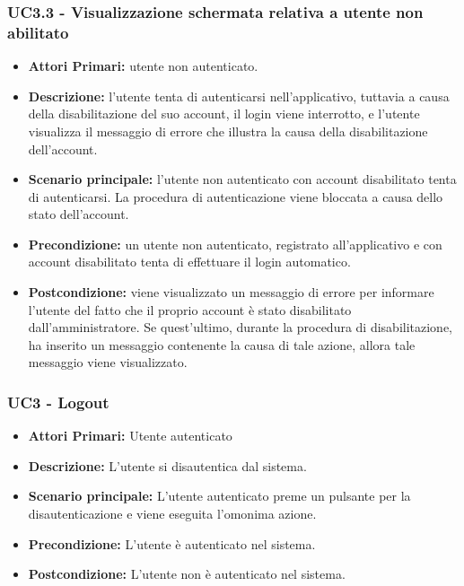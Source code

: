 \subsubsection{ UC3.3 - Visualizzazione schermata relativa a utente non abilitato}
\begin{itemize}
           	\item\textbf{Attori Primari:} utente non autenticato.
           	\item\textbf{Descrizione:} l'utente tenta di autenticarsi nell'applicativo, tuttavia a causa della disabilitazione del suo account, il login viene interrotto, e
           	l'utente visualizza il messaggio di errore che illustra la causa della disabilitazione dell'account.
           	\item\textbf{Scenario principale:} l’utente non autenticato con account disabilitato tenta di autenticarsi. 
           	La procedura di autenticazione viene bloccata a causa dello stato dell'account.
           	\item\textbf{Precondizione:} un utente non autenticato, registrato all'applicativo e con account disabilitato tenta di effettuare il login automatico. 
           	\item\textbf{Postcondizione:} viene visualizzato un messaggio di errore per informare l'utente del fatto che il 
           	proprio account è stato disabilitato dall'amministratore. Se quest'ultimo, durante la procedura di disabilitazione, ha inserito un messaggio contenente la causa di tale azione, allora tale messaggio viene visualizzato.
\end{itemize}

\subsubsection{ UC3 - Logout}
\begin{itemize}
	\item\textbf{Attori Primari:} 
	Utente autenticato
	\item\textbf{Descrizione:} 
	L'utente si disautentica dal sistema.
	\item\textbf{Scenario principale:} 
	L'utente autenticato preme un pulsante per la disautenticazione e viene eseguita l'omonima azione.
	\item\textbf{Precondizione:} 
	L'utente è autenticato nel sistema.
	\item\textbf{Postcondizione:}
	L'utente non è autenticato nel sistema.
\end{itemize}

